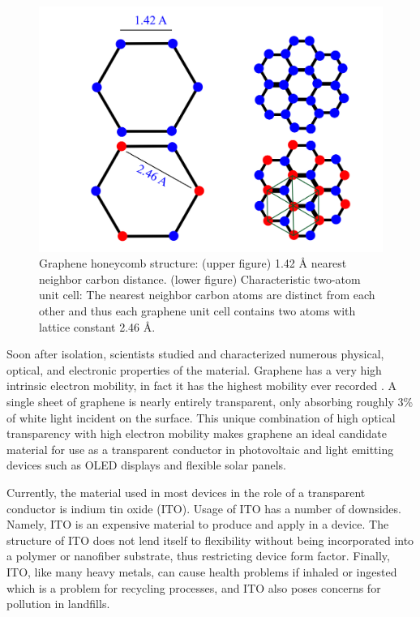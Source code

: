 \begin{figure}
    \centering 
        \includegraphics{figs/hexagonswithlength.jpg}
    \caption{Graphene honeycomb structure: (upper figure) 1.42 {\AA} nearest neighbor carbon distance. (lower figure) Characteristic two-atom unit cell: The nearest neighbor carbon atoms are distinct from each other and thus each graphene unit cell contains two atoms with lattice constant 2.46 {\AA}.
}
\label{Graphene-Structure-Figure}
\end{figure}

Soon after isolation, scientists studied and characterized numerous physical, optical, and electronic properties of the material. Graphene has a very high intrinsic electron mobility, in fact it has the highest mobility ever recorded \cite{Wolf}. A single sheet of graphene is nearly entirely transparent, only absorbing roughly 3\% of white light incident on the surface. This unique combination of high optical transparency with high electron mobility makes graphene an ideal candidate material for use as a transparent conductor in photovoltaic and light emitting devices such as OLED displays and flexible solar panels.

Currently, the material used in most devices in the role of a transparent conductor is indium tin oxide (ITO). Usage of ITO has a number of downsides. Namely, ITO is an expensive material to produce and apply in a device. The structure of ITO does not lend itself to flexibility without being incorporated into a polymer or nanofiber substrate, thus restricting device form factor. Finally, ITO, like many heavy metals, can cause health problems if inhaled or ingested which is a problem for recycling processes, and ITO also poses concerns for pollution in landfills.

